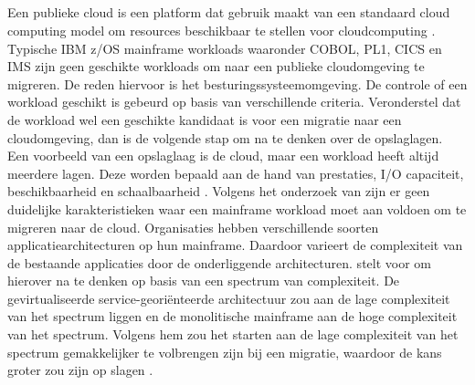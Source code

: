 \subsection{}
\label{sec:Welke workloads kunnen gemigreerd worden naar de cloud?}

Een publieke cloud is een platform dat gebruik maakt van een standaard cloud computing model om resources beschikbaar te stellen voor cloudcomputing \textcite{Allison2016}. Typische IBM z/OS mainframe workloads waaronder COBOL, PL1, CICS en IMS zijn geen geschikte workloads om naar een publieke cloudomgeving te migreren. De reden hiervoor is het besturingssysteemomgeving. De controle of een workload geschikt is gebeurd op basis van verschillende criteria. Veronderstel dat de workload wel een geschikte kandidaat is voor een migratie naar een cloudomgeving, dan is de volgende stap om na te denken over de opslaglagen. Een voorbeeld van een opslaglaag is de cloud, maar een workload heeft altijd meerdere lagen. Deze worden bepaald aan de hand van prestaties, I/O capaciteit, beschikbaarheid en schaalbaarheid \autocite{Allison2016}. Volgens het onderzoek van \textcite{Martikainen2018} zijn er geen duidelijke karakteristieken waar een mainframe workload moet aan voldoen om te migreren naar de cloud. Organisaties hebben verschillende soorten applicatiearchitecturen op hun mainframe. Daardoor varieert de complexiteit van de bestaande applicaties door de onderliggende architecturen. \textcite{Orban2016} stelt voor om hierover na te denken op basis van een spectrum van complexiteit. De gevirtualiseerde service-georiënteerde architectuur zou aan de lage complexiteit van het spectrum liggen en de monolitische mainframe aan de hoge complexiteit van het spectrum. Volgens hem zou het starten aan de lage complexiteit van het spectrum gemakkelijker te volbrengen zijn bij een migratie, waardoor de kans groter zou zijn op slagen \autocite{Orban2016}. 

